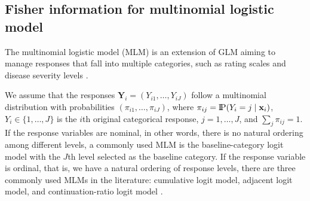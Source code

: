 \subsection{Fisher information for multinomial logistic model}\label{sec:model_fisher_mlm}


The multinomial logistic model (MLM) is an extension of GLM aiming to manage responses that fall into multiple categories, such as rating scales and disease severity levels \citep{agresti2013}.

We assume that the responses $\mathbf Y_i = (Y_{i1},\dots,Y_{iJ})$ follow a multinomial distribution with probabilities $(\pi_{i1}, \dots,  \pi_{iJ})$, where $\pi_{ij} = \P(Y_i=j \mid {\mathbf x}_i)$, $Y_i \in \{1, \ldots, J\}$ is the $i$th original categorical response, $j = 1,\dots, J$, and $\sum_j \pi_{ij} = 1$. If the response variables are nominal, in other words, there is no natural ordering among different levels, a commonly used MLM is the baseline-category logit model with the $J$th level selected as the baseline category. If the response variable is ordinal, that is, we have a natural ordering of response levels, there are three commonly used MLMs in the literature: cumulative logit model, adjacent logit model, and continuation-ratio logit model \citep{bu2020, dousti2023categorical, wang2023identifying}.

